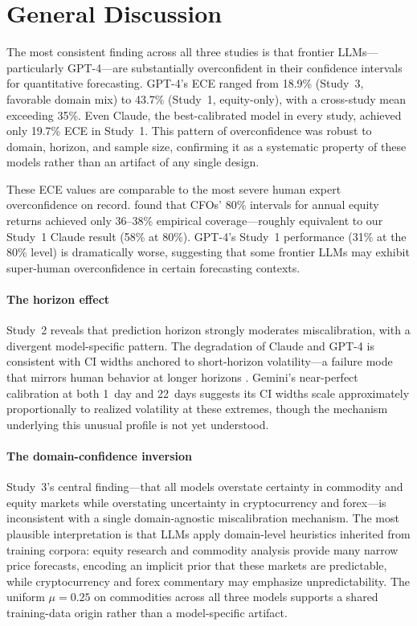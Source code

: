 
\section{General Discussion}

The most consistent finding across all three studies is that frontier
LLMs---particularly GPT-4---are substantially overconfident in their confidence
intervals for quantitative forecasting. GPT-4's ECE ranged from 18.9\%
(Study~3, favorable domain mix) to 43.7\% (Study~1, equity-only), with a
cross-study mean exceeding 35\%. Even Claude, the best-calibrated model in
every study, achieved only 19.7\% ECE in Study~1. This pattern of overconfidence
was robust to domain, horizon, and sample size, confirming it as a systematic
property of these models rather than an artifact of any single design.

These ECE values are comparable to the most severe human expert overconfidence
on record. \citet{BenDavid2013} found that CFOs' 80\% intervals for annual
equity returns achieved only 36--38\% empirical coverage---roughly equivalent
to our Study~1 Claude result (58\% at 80\%). GPT-4's Study~1 performance
(31\% at the 80\% level) is dramatically worse, suggesting that some frontier
LLMs may exhibit super-human overconfidence in certain forecasting contexts.

\paragraph{The horizon effect} Study~2 reveals that prediction horizon
strongly moderates miscalibration, with a divergent model-specific pattern.
The degradation of Claude and GPT-4 is consistent with CI widths anchored
to short-horizon volatility---a failure mode that mirrors human behavior
at longer horizons \citep{Griffin1992}. Gemini's near-perfect calibration
at both 1~day and 22~days suggests its CI widths scale approximately
proportionally to realized volatility at these extremes, though the mechanism
underlying this unusual profile is not yet understood.

\paragraph{The domain-confidence inversion} Study~3's central finding---that
all models overstate certainty in commodity and equity markets while
overstating uncertainty in cryptocurrency and forex---is inconsistent with a
single domain-agnostic miscalibration mechanism. The most plausible
interpretation is that LLMs apply domain-level heuristics inherited from
training corpora: equity research and commodity analysis provide many narrow
price forecasts, encoding an implicit prior that these markets are predictable,
while cryptocurrency and forex commentary may emphasize unpredictability.
The uniform $\mu = 0.25$ on commodities across all three models supports
a shared training-data origin rather than a model-specific artifact.

